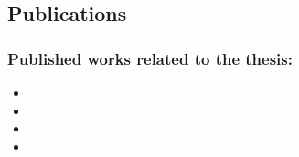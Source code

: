\subsection{Publications}
\subsubsection{Published works related to the thesis:}
\begin{itemize}
	\item {}
	\item {} 
	\item {}
  \item {}
\end{itemize}

